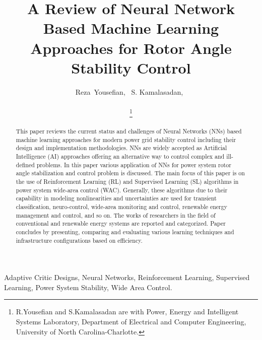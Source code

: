 \documentclass[journal]{IEEEtran}
\begin{document}
	\IEEEoverridecommandlockouts
	\title{A Review of Neural Network Based Machine Learning Approaches for Rotor Angle Stability Control}
	\newcommand{\squeezeup}{\vspace{-10mm}}
	\author{Reza~Yousefian,~
		S. Kamalasadan,~\\
	
	\vspace{-5.5mm} 
	
		\thanks{R.Yousefian and S.Kamalasadan are with Power, Energy and Intelligent Systems Laboratory, Department of Electrical and Computer Engineering, University of North Carolina-Charlotte.}}
	
	\vspace{-5.5mm} 

	\maketitle
	
	

\begin{abstract}
This paper reviews the current status and challenges of Neural Networks (NNs) based machine learning approaches for modern power grid stability control including their design and implementation methodologies. NNs are widely accepted as Artificial Intelligence (AI) approaches offering an alternative way to control complex and ill-defined problems. In this paper various application of NNs  for power system rotor angle stabilization and control problem is discussed. The main focus of this paper is on the use of Reinforcement Learning (RL) and Supervised Learning (SL) algorithms in power system wide-area control (WAC). Generally, these algorithms due to their capability in modeling nonlinearities and uncertainties are used for transient classification, neuro-control, wide-area monitoring and control, renewable energy management and control, and so on. The works of researchers in the field of conventional and renewable energy systems are reported and categorized. Paper concludes by presenting, comparing and evaluating various learning techniques and infrastructure configurations based on efficiency. 
\end{abstract}

\begin{IEEEkeywords}
Adaptive Critic Designs, Neural Networks, Reinforcement Learning, Supervised Learning, Power System Stability, Wide Area Control. 
\end{IEEEkeywords}
\end{document}
